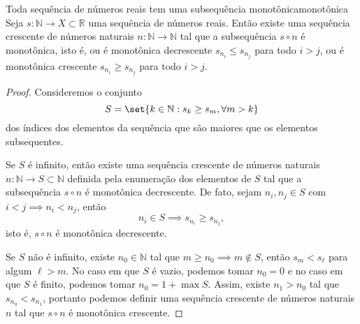 \begin{lemma}{Toda sequência de números reais tem uma subsequência monotônica}{monotônica}
    Seja \(s: \mathbb{N} \to X \subset \mathbb{R}\) uma sequência de números reais. Então existe uma sequência crescente de números naturais \(n : \mathbb{N} \to \mathbb{N}\) tal que a subsequência \(s\circ n\) é monotônica, isto é, ou é monotônica decrescente \(s_{n_{i}} \leq s_{n_{j}}\) para todo \(i > j\), ou é monotônica crescente \(s_{n_{i}} \geq s_{n_{j}}\) para todo \(i > j\).
\end{lemma}
\begin{proof}
    Consideremos o conjunto
    \begin{equation*}
        S = \set{k \in \mathbb{N} : s_k \geq s_m, \forall m > k}
    \end{equation*}
    dos índices dos elementos da sequência que são maiores que os elementos subsequentes.

    Se \(S\) é infinito, então existe uma sequência crescente de números naturais \(n : \mathbb{N} \to S \subset \mathbb{N}\) definida pela enumeração dos elementos de \(S\) tal que a subsequência \(s \circ n\) é monotônica decrescente. De fato, sejam \(n_i, n_j \in S\) com \(i < j \implies n_i < n_j\), então
    \begin{equation*}
        n_i \in S \implies s_{n_i} \geq s_{n_j},
    \end{equation*}
    isto é, \(s\circ n\) é monotônica decrescente.

    Se \(S\) não é infinito, existe \(n_0 \in \mathbb{N}\) tal que \(m \geq n_0 \implies m \notin S\), então \(s_{m} < s_{\ell}\) para algum \(\ell > m\). No caso em que \(S\) é vazio, podemos tomar \(n_0 = 0\) e no caso em que \(S\) é finito, podemos tomar \(n_0 = 1 + \max S\). Assim, existe \(n_1 > n_0\) tal que \(s_{n_0} < s_{n_1}\), portanto podemos definir uma sequência crescente de números naturais \(n\) tal que \(s\circ n\) é monotônica crescente.
\end{proof}

